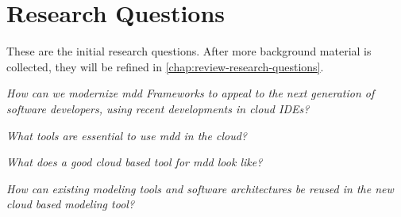 \section{Research Questions}\label{chap:research-questions}

These are the initial research questions. After more background material is collected, they will be refined in \cref{chap:review-research-questions}.

\begin{questions}[leftmargin=1cm]
  \item \emph{How can we modernize \acrlong{mdd} Frameworks to appeal to the next generation of software developers, using recent developments in \gls{cloud} \acrshort{IDE}s?}\label{rq:1}
  \begin{questions}  
    \item \emph{What tools are essential to use \acrlong{mdd} in the \gls{cloud}?}\label{rq:2}
    \item \emph{What does a good \gls{cloud} based tool for \acrlong{mdd} look like?}\label{rq:3}
    \item \emph{How can existing modeling tools and software architectures be reused in the new \gls{cloud} based modeling tool?}\label{rq:4}
  \end{questions}
\end{questions}


